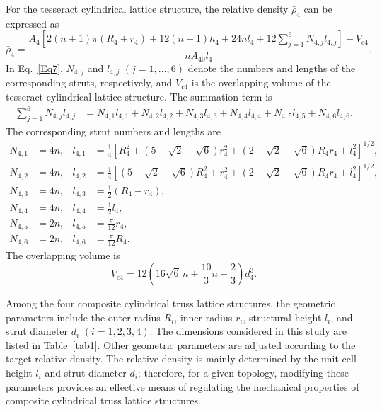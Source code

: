 \documentclass[12pt,a4paper]{article}
\begin{document}
For the tesseract cylindrical lattice structure, the relative density $\bar{\rho}_4$ can be expressed as
%
\begin{equation}
	\bar{\rho}_4 =
	\frac{
		A_4\left[
		2(n+1)\pi(R_4+r_4)
		+12(n+1)h_4
		+24n l_4
		+12\sum_{j=1}^{6}N_{4,j}l_{4,j}
		\right]
		-V_{c4}
	}{
		nA_{40}l_4
	}.
	\label{Eq7}
\end{equation}
%
In Eq.~\eqref{Eq7}, $N_{4,j}$ and $l_{4,j}$ $(j=1,\ldots,6)$ denote the numbers and lengths of the corresponding struts, respectively, and $V_{c4}$ is the overlapping volume of the tesseract cylindrical lattice structure. The summation term is
%
\[
\begin{aligned}
	\sum_{j=1}^{6}N_{4,j}l_{4,j}
	&=
	N_{4,1}l_{4,1}
	+N_{4,2}l_{4,2}
	+N_{4,3}l_{4,3}
	+N_{4,4}l_{4,4}
	+N_{4,5}l_{4,5}
	+N_{4,6}l_{4,6}.
\end{aligned}
\]
%
The corresponding strut numbers and lengths are
%
\[
\begin{aligned}
	N_{4,1} &= 4n, &
	l_{4,1} &=
	\frac{1}{4}
	\left[
	R_4^2
	+\left(5-\sqrt{2}-\sqrt{6}\right)r_4^2
	+\left(2-\sqrt{2}-\sqrt{6}\right)R_4r_4
	+l_4^2
	\right]^{1/2}, \\[0.5em]
	N_{4,2} &= 4n, &
	l_{4,2} &=
	\frac{1}{4}
	\left[
	\left(5-\sqrt{2}-\sqrt{6}\right)R_4^2
	+r_4^2
	+\left(2-\sqrt{2}-\sqrt{6}\right)R_4r_4
	+l_4^2
	\right]^{1/2}, \\[0.5em]
	N_{4,3} &= 4n, &
	l_{4,3} &= \frac{1}{2}\left(R_4-r_4\right), \\[0.5em]
	N_{4,4} &= 4n, &
	l_{4,4} &= \frac{1}{2}l_4, \\[0.5em]
	N_{4,5} &= 2n, &
	l_{4,5} &= \frac{\pi}{12}r_4, \\[0.5em]
	N_{4,6} &= 2n, &
	l_{4,6} &= \frac{\pi}{12}R_4.
\end{aligned}
\]
%
The overlapping volume is
%
\[
V_{c4} =
12\left(16\sqrt{6}\,n+\frac{10}{3}n+\frac{2}{3}\right)d_4^3.
\]

Among the four composite cylindrical truss lattice structures, the geometric parameters include the outer radius $R_i$, inner radius $r_i$, structural height $l_i$, and strut diameter $d_i$ $(i=1,2,3,4)$. The dimensions considered in this study are listed in Table~\ref{tab1}. Other geometric parameters are adjusted according to the target relative density. The relative density is mainly determined by the unit-cell height $l_i$ and strut diameter $d_i$; therefore, for a given topology, modifying these parameters provides an effective means of regulating the mechanical properties of composite cylindrical truss lattice structures.
\end{document}
